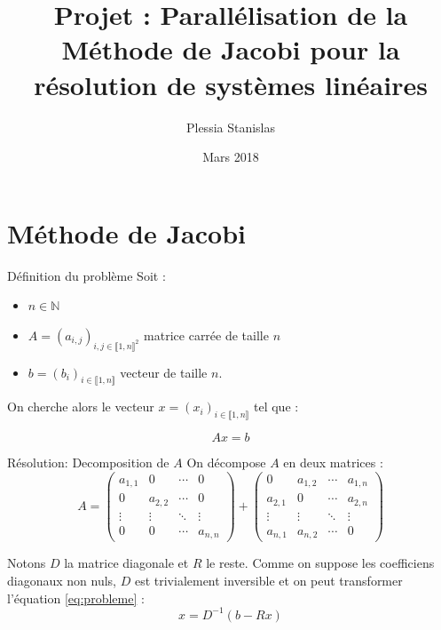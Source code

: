 \documentclass{beamer}
\title[Parallélisation de l'algorithme de Jacobi]{Projet : Parallélisation de la Méthode de Jacobi pour la résolution de systèmes linéaires}
\author{Plessia Stanislas}
\institute{}
\date{Mars 2018}
\begin{document}
\begin{frame}
  \titlepage
\end{frame}

\section{Méthode de Jacobi}

\begin{frame}{Définition du problème}
  Soit :
  \begin{itemize}
   \item $n \in \mathbb{N}$ 
   \item $A = (a_{i,j})_{i,j \in \llbracket 1,n \rrbracket^2}$ matrice carrée de taille $n$
   \item $b = (b_i)_{i \in \llbracket 1,n \rrbracket}$ vecteur de taille $n$.
  \end{itemize}

  On cherche alors le vecteur $x = (x_i)_{i \in \llbracket 1,n \rrbracket}$ tel que :

  \begin{equation} 
      \label{eq:probleme}
      Ax = b
  \end{equation}
\end{frame}

\begin{frame}{Résolution: Decomposition de $A$}
  On décompose $A$ en deux matrices :
  \[
  A =
    \begin{pmatrix}
    a_{1,1} & 0 & \cdots & 0 \\
    0 & a_{2,2} & \cdots & 0 \\
    \vdots  & \vdots  & \ddots & \vdots  \\
    0 & 0 & \cdots & a_{n,n}
   \end{pmatrix}
   +
    \begin{pmatrix}
    0 & a_{1,2} & \cdots & a_{1,n} \\
    a_{2,1} & 0 & \cdots & a_{2,n} \\
    \vdots  & \vdots  & \ddots & \vdots  \\
    a_{n,1} & a_{n,2} & \cdots & 0
   \end{pmatrix}
  \]

  Notons $D$ la matrice diagonale et $R$ le reste.
  Comme on suppose les coefficiens diagonaux non nuls, $D$ est trivialement inversible et on peut transformer l'équation \eqref{eq:probleme} :
  \[
    x = D^{-1}(b - Rx)
  \]
\end{frame}
\end{document}
